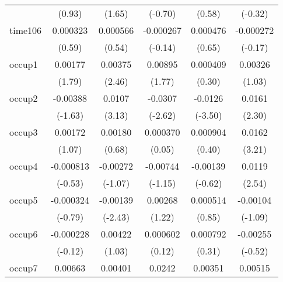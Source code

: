 \begin{table}[htbp]
\begin{tabular}{l*{5}{c}}
            &      (0.93)         &      (1.65)         &     (-0.70)         &      (0.58)         &     (-0.32)         \\
time106     &    0.000323         &    0.000566         &   -0.000267         &    0.000476         &   -0.000272         \\
            &      (0.59)         &      (0.54)         &     (-0.14)         &      (0.65)         &     (-0.17)         \\
occup1      &     0.00177         &     0.00375\sym{*}  &     0.00895         &    0.000409         &     0.00326         \\
            &      (1.79)         &      (2.46)         &      (1.77)         &      (0.30)         &      (1.03)         \\
occup2      &    -0.00388         &      0.0107\sym{**} &     -0.0307\sym{**} &     -0.0126\sym{***}&      0.0161\sym{*}  \\
            &     (-1.63)         &      (3.13)         &     (-2.62)         &     (-3.50)         &      (2.30)         \\
occup3      &     0.00172         &     0.00180         &    0.000370         &    0.000904         &      0.0162\sym{**} \\
            &      (1.07)         &      (0.68)         &      (0.05)         &      (0.40)         &      (3.21)         \\
occup4      &   -0.000813         &    -0.00272         &    -0.00744         &    -0.00139         &      0.0119\sym{*}  \\
            &     (-0.53)         &     (-1.07)         &     (-1.15)         &     (-0.62)         &      (2.54)         \\
occup5      &   -0.000324         &    -0.00139\sym{*}  &     0.00268         &    0.000514         &    -0.00104         \\
            &     (-0.79)         &     (-2.43)         &      (1.22)         &      (0.85)         &     (-1.09)         \\
occup6      &   -0.000228         &     0.00422         &    0.000602         &    0.000792         &    -0.00255         \\
            &     (-0.12)         &      (1.03)         &      (0.12)         &      (0.31)         &     (-0.52)         \\
occup7      &     0.00663\sym{***}&     0.00401         &      0.0242\sym{**} &     0.00351         &     0.00515         \\

\end{tabular}
\end{table}
